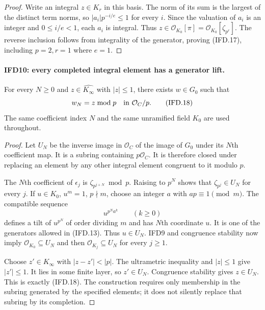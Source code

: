 \begin{proof}
Write an integral $z\in K_r$ in this basis. The norm of its sum is
the largest of the distinct term norms, so
$|a_i|p^{-i/e}\leq1$ for every $i$. Since the valuation of $a_i$
is an integer and $0\leq i/e<1$, each $a_i$ is integral.
Thus $z\in\mathcal O_{K_0}[\pi]=\mathcal O_{K_0}[\zeta_{p^r}]$.
The reverse inclusion follows from integrality of the generator,
proving (IFD.17), including $p=2,r=1$ where $e=1$.
\end{proof}

\paragraph{IFD10: every completed integral element has a generator lift.}
\label{claim:IFD10}
For every $N\geq0$ and $z\in\widehat{K_\infty}$ with $|z|\leq1$,
there exists $w\in G_0$ such that
\[
                  w_N=z\bmod p\quad\hbox{in }\mathcal O_C/p.
                                                               \tag{IFD.18}
\]
The same coefficient index $N$ and the same unramified field $K_0$
are used throughout.

\begin{proof}
Let $U_N$ be the inverse image in $\mathcal O_C$ of the image of
$G_0$ under its $N$th coefficient map. It is a subring containing
$p\mathcal O_C$. It is therefore closed under replacing an element
by any other integral element congruent to it modulo $p$.

The $N$th coefficient of $\epsilon_j$ is
$\zeta_{p^{j+N}}\bmod p$. Raising to $p^N$ shows that
$\zeta_{p^j}\in U_N$ for every $j$.
If $u\in K_0$, $u^m=1$, $p\nmid m$, choose an integer
$a$ with $ap\equiv1\pmod m$. The compatible sequence
\[
                           u^{p^N a^k}\qquad(k\geq0)
\]
defines a tilt of $u^{p^N}$ of order dividing $m$ and has $N$th
coordinate $u$. It is one of the generators allowed in (IFD.13).
Thus $u\in U_N$. IFD9 and congruence stability now imply
$\mathcal O_{K_0}\subseteq U_N$ and then
$\mathcal O_{K_j}\subseteq U_N$ for every $j\geq1$.

Choose $z'\in K_\infty$ with $|z-z'|<|p|$. The ultrametric
inequality and $|z|\leq1$ give $|z'|\leq1$. It lies in some finite
layer, so $z'\in U_N$. Congruence stability gives $z\in U_N$.
This is exactly (IFD.18). The construction requires only membership
in the subring generated by the specified elements; it does not
silently replace that subring by its completion.
\end{proof}


